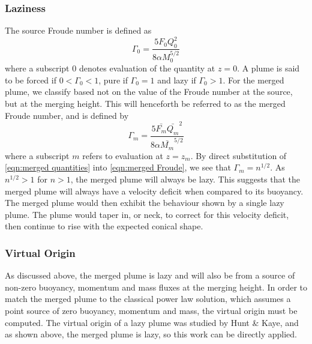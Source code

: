 \documentclass{jfm}
\begin{document}
	\subsubsection{Laziness}
	The source Froude number is defined as 
	\begin{equation}
		\Gamma_0 = \frac{5F_0Q_0^2}{8\alpha M_0^{5/2}}
	\end{equation}
	where a subscript 0 denotes evaluation of the quantity at $z = 0$. A plume is said to be forced if $0 <\Gamma_0 < 1$, pure if $\Gamma_0 = 1$ and lazy if $\Gamma_0 > 1$. For the merged plume, we classify based not on the value of the Froude number at the source, but at the merging height. This will henceforth be referred to as the merged Froude number, and is defined by 
	\begin{equation}
		\Gamma_m = \frac{5\bar{F_m}\bar{Q_m}^2}{8\alpha \bar{M_m}^{5/2}} \label{eqn:merged Froude}
	\end{equation}
	where a subscript $m$ refers to evaluation at $z = z_m$. By direct substitution of \eqref{eqn:merged quantities} into \eqref{eqn:merged Froude}, we see that $\Gamma_m = n^{1/2}$. As $n^{1/2} > 1$ for $n > 1$, the merged plume will always be lazy. This suggests that the merged plume will always have a velocity deficit when compared to its buoyancy. The merged plume would then exhibit the behaviour shown by a single lazy plume. The plume would taper in, or neck, to correct for this velocity deficit, then continue to rise with the expected conical shape.
	
	\subsubsection{Virtual Origin}
	As discussed above, the merged plume is lazy and will also be from a source of non-zero buoyancy, momentum and mass fluxes at the merging height. In order to match the merged plume to the classical power law solution, which assumes a point source of zero buoyancy, momentum and mass, the virtual origin must be computed. The virtual origin of a lazy plume was studied by Hunt \& Kaye, and as shown above, the merged plume is lazy, so this work can be directly applied. 
	
\end{document}
